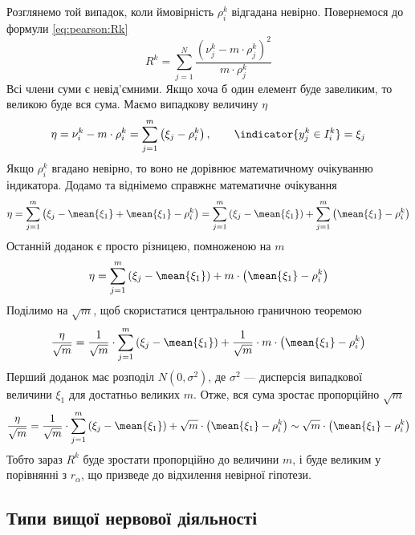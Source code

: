 Розглянемо той випадок, коли ймовірність $\rho_i^k$
відгадана невірно. Повернемося до формули \eqref{eq:pearson:Rk}
\begin{equation*}
  R^k
  = \sum_{j=1}^{N}\frac{\left( \nu_j^k - m \cdot \rho_j^k \right)^2}{m \cdot \rho_j^k}
\end{equation*}
Всі члени суми є невід’ємними. Якщо хоча б один елемент буде завеликим,
то великою буде вся сума. Маємо випадкову величину $\eta$
\begin{equation*}
  \eta
  = \nu_i^k - m \cdot \rho_i^k
  = \sum_{j=1}^{m} \left( \xi_j - \rho_i^k \right),
  \qquad \indicator{y_j^k \in I_i^k} = \xi_j
\end{equation*}
Якщо $\rho_i^k$ вгадано невірно, то воно не дорівнює математичному очікуванню
індикатора. Додамо та віднімемо справжнє математичне очікування
\begin{equation*}
  \eta
  = \sum_{j=1}^{m} \left( \xi_j - \mean{\xi_1} + \mean{\xi_1} - \rho_i^k \right)
  = \sum_{j=1}^{m} \left( \xi_j - \mean{\xi_1} \right)
    + \sum_{j=1}^{m} \left( \mean{\xi_1} - \rho_i^k \right)
\end{equation*}
Останній доданок є просто різницею, помноженою на $m$
\begin{equation*}
  \eta
  = \sum_{j=1}^{m} \left( \xi_j - \mean{\xi_1} \right)
    + m \cdot \left( \mean{\xi_1} - \rho_i^k \right)
\end{equation*}
Поділимо на $\sqrt{m}$, щоб скористатися центральною граничною теоремою
\begin{equation*}
  \frac{\eta}{\sqrt{m}}
  = \frac{1}{\sqrt{m}} \cdot \sum_{j=1}^{m} \left( \xi_j - \mean{\xi_1} \right)
    + \frac{1}{\sqrt{m}} \cdot m \cdot \left( \mean{\xi_1} - \rho_i^k \right)
\end{equation*}
Перший доданок має розподіл $N\left( 0, \sigma^2 \right)$, де $\sigma^2$ ---
дисперсія випадкової величини $\xi_1$ для достатньо великих $m$.
Отже, вся сума зростає пропорційно
$\sqrt{m}$
\begin{equation*}
  \frac{\eta}{\sqrt{m}}
  = \frac{1}{\sqrt{m}} \cdot \sum_{j=1}^{m} \left( \xi_j - \mean{\xi_1} \right)
    + \sqrt{m} \cdot \left( \mean{\xi_1} - \rho_i^k \right)
  \sim \sqrt{m} \cdot \left( \mean{\xi_1} - \rho_i^k \right)
\end{equation*}
Тобто зараз $R^k$ буде зростати пропорційно до величини
$m$, і буде великим у порівнянні з $r_{\alpha}$, що призведе до відхилення
невірної гіпотези.

\subsection{Типи вищої нервової діяльності}


